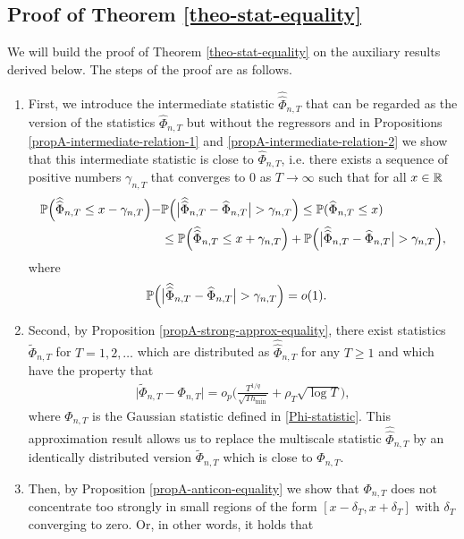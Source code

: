 \documentclass[a4paper,12pt]{article}
\newcommand{\doublehattwo}[1]{\widehat{\widehat{#1}}}
\begin{document}
\subsection{Proof of Theorem \ref{theo-stat-equality}}\label{subsec-appendix-stat-equality}

We will build the proof of Theorem \ref{theo-stat-equality} on the auxiliary results derived below. The steps of the proof are as follows.
\begin{enumerate}
\item First, we introduce the intermediate statistic $\doublehattwo{\Phi}_{n, T}$ that can be regarded as the version of the statistics $\widehat{\Phi}_{n, T}$ but without the regressors and in Propositions \ref{propA-intermediate-relation-1} and \ref{propA-intermediate-relation-2} we show that this intermediate statistic is close to $\widehat{\Phi}_{n, T}$, i.e. there exists a sequence of positive numbers $\gamma_{n, T}$ that converges to $0$ as $T \to \infty$ such that for all $x\in \mathbb{R}$ 
\begin{align*}
\pr\Big(\doublehattwo{\Phi}_{n,T} \le x - \gamma_{n, T}\Big) - &\pr \Big(\big|\doublehattwo{\Phi}_{n,T} - \widehat{\Phi}_{n,T}\big| > \gamma_{n, T} \Big)\le \pr(\widehat{\Phi}_{n, T} \le x) \\
&\le\pr\Big(\doublehattwo{\Phi}_{n,T} \le x + \gamma_{n, T}\Big) + \pr \Big(\big|\doublehattwo{\Phi}_{n,T} - \widehat{\Phi}_{n,T}\big| > \gamma_{n, T} \Big),
\end{align*}
where
\begin{align*} \pr \Big(\big|\doublehattwo{\Phi}_{n,T} &- \widehat{\Phi}_{n,T}\big| > \gamma_{n, T} \Big) = o(1).
\end{align*}
\item Second, by Proposition \ref{propA-strong-approx-equality}, there exist statistics $\widetilde{\Phi}_{n, T}$ for $T = 1,2,\ldots$ which are distributed as $\doublehattwo{\Phi}_{n, T}$ for any $T \ge 1$ and which have the property that 
\begin{align*}
\big| \widetilde{\Phi}_{n, T} - \Phi_{n,T} \big| = o_p \Big( \frac{T^{1/q}}{\sqrt{T h_{\min}}} + \rho_T\sqrt{\log T} \Big),
\end{align*}
where $\Phi_{n, T}$ is the Gaussian statistic defined in \eqref{Phi-statistic}. This approximation result allows us to replace the multiscale statistic $\doublehattwo{\Phi}_{n, T}$ by an identically distributed version $\widetilde{\Phi}_{n, T}$ which is close to $\Phi_{n, T}$.
\item Then, by Proposition \ref{propA-anticon-equality} we show that $\Phi_{n,T}$ does not concentrate too strongly in small regions of the form $[x-\delta_T,x+\delta_T]$ with $\delta_T$ converging to zero. Or, in other words, it holds that 

\end{enumerate}
\end{document}
